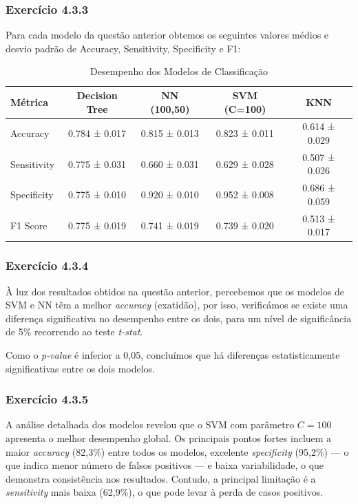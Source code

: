 \documentclass[conference]{IEEEtran}
\begin{document}
\medskip

\subsubsection{\textbf{Exercício 4.3.3}}

Para cada modelo da questão anterior obtemos os seguintes valores médios e desvio padrão de Accuracy, Sensitivity, Specificity e F1:

\begin{table}[h]
	\centering
	\scriptsize
	\caption{Desempenho dos Modelos de Classificação}
	\begin{tabular}{|l|c|c|c|c|}
		\hline
		\textbf{Métrica} & \textbf{Decision Tree} & \textbf{NN (100,50)} & \textbf{SVM (C=100)} & \textbf{KNN} \\
		\hline
		Accuracy    & 0.784 ± 0.017   & 0.815 ± 0.013 & 0.823 ± 0.011 & 0.614 ± 0.029 \\
		Sensitivity & 0.775 ± 0.031   & 0.660 ± 0.031 & 0.629 ± 0.028 & 0.507 ± 0.026 \\
		Specificity & 0.775 ± 0.010   & 0.920 ± 0.010 & 0.952 ± 0.008 & 0.686 ± 0.059 \\
		F1 Score    & 0.775 ± 0.019   & 0.741 ± 0.019 & 0.739 ± 0.020 & 0.513 ± 0.017 \\
		\hline
	\end{tabular}
\end{table}


\medskip

\subsubsection{\textbf{Exercício 4.3.4}}

À luz dos resultados obtidos na questão anterior, percebemos que os modelos de SVM e NN têm a melhor \textit{accuracy} (exatidão), por isso, verificámos se existe uma diferença significativa no desempenho entre os dois, para um nível de significância de 5\% recorrendo ao teste \textit{t-stat}.

Como o\textit{ p-value} é inferior a 0,05, concluímos que há diferenças estatisticamente significativas entre os dois modelos.


\medskip

\subsubsection{\textbf{Exercício 4.3.5}}

A análise detalhada dos modelos revelou que o SVM com parâmetro \( C=100 \) apresenta o melhor desempenho global. Os principais pontos fortes incluem a maior \textit{accuracy} (82{,}3\%) entre todos os modelos, excelente \textit{specificity} (95{,}2\%) — o que indica menor número de falsos positivos — e baixa variabilidade, o que demonstra consistência nos resultados. Contudo, a principal limitação é a \textit{sensitivity} mais baixa (62{,}9\%), o que pode levar à perda de casos positivos.
\end{document}
